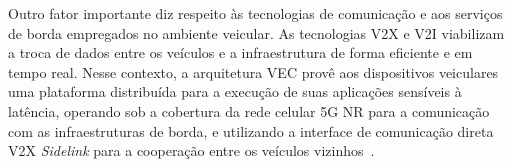 Outro fator importante diz respeito às tecnologias de comunicação e aos serviços de borda empregados no ambiente veicular. As tecnologias \gls{V2X} e \gls{V2I} viabilizam a troca de dados entre os veículos e a infraestrutura de forma eficiente e em tempo real. Nesse contexto, a arquitetura \gls{VEC} provê aos dispositivos veiculares uma plataforma distribuída para a execução de suas aplicações sensíveis à latência, operando sob a cobertura da rede celular \gls{5G} \gls{NR} para a comunicação com as infraestruturas de borda, e utilizando a interface de comunicação direta \gls{V2X} \textit{Sidelink} para a cooperação entre os veículos vizinhos~\cite{chao2025, luo2024}.






